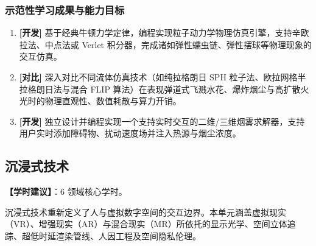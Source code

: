 \subsubsection{示范性学习成果与能力目标}
\begin{enumerate}
    \item \textbf{[开发]} 基于经典牛顿力学定律，编程实现粒子动力学物理仿真引擎，支持辛欧拉法、中点法或 Verlet 积分器，完成诸如弹性蠕虫链、弹性摆球等物理现象的交互仿真。
    \item \textbf{[对比]} 深入对比不同流体仿真技术（如纯拉格朗日 SPH 粒子法、欧拉网格半拉格朗日法与混合 FLIP 算法）在表现弹道式飞溅水花、爆炸烟尘与高扩散火光时的物理直观性、数值耗散与算力开销。
    \item \textbf{[开发]} 独立设计并编程实现一个支持实时交互的二维/三维烟雾求解器，支持用户实时添加障碍物、扰动速度场并注入热源与烟尘浓度。
\end{enumerate}

\subsection{沉浸式技术}
\textbf{【学时建议】}：6 领域核心学时。

沉浸式技术重新定义了人与虚拟数字空间的交互边界。本单元涵盖虚拟现实（VR）、增强现实（AR）与混合现实（MR）所依托的显示光学、空间立体追踪、超低时延渲染管线、人因工程及空间隐私伦理。


